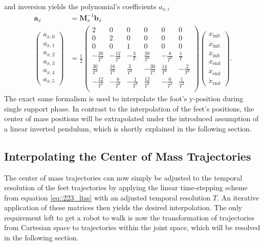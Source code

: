 and inversion yields the polynomial's coefficients $a_{x,i}$
\begin{align}
	\bm{a}_x &= \bm{M}_x^{-1}\bm{b}_x \\
	\begin{pmatrix}
		a_{x,0} \\
		a_{x,1} \\
		a_{x,2} \\
		a_{x,3} \\
		a_{x,4} \\
		a_{x,5}
	\end{pmatrix} &= 
	\frac{1}{2}
	\begin{pmatrix}
		2 & 0 & 0 & 0 & 0 & 0 \\
		0 & 2 & 0 & 0 & 0 & 0 \\
		0 & 0 & 1 & 0 & 0 & 0 \\
		-\frac{20}{T^3} & -\frac{12}{T^2} & -\frac{3}{T} & \frac{20}{T^3} & -\frac{8}{T^2} & \frac{1}{T} \\
		\frac{30}{T^4} & \frac{16}{T^3} & \frac{3}{T^2} & -\frac{30}{T^4} & \frac{14}{T^3} & -\frac{2}{T^2} \\
		-\frac{12}{T^5} & -\frac{6}{T^4} & -\frac{1}{T^3} & \frac{12}{T^5} & -\frac{6}{T^4} & \frac{1}{T^3} \\
	\end{pmatrix}
	\begin{pmatrix}
		x_\text{init} \\
		\dot{x}_\text{init} \\
		\ddot{x}_\text{init} \\
		x_\text{end} \\
		\dot{x}_\text{end} \\
		\ddot{x}_\text{end} 
	\end{pmatrix}.
	\label{eq::231_ai_5th}
\end{align}
The exact same formalism is used to interpolate the foot's y-position during single support phase. In contrast to the interpolation of the feet's positions, the center of mass positions will be extrapolated under the introduced assumption of a linear inverted pendulum, which is shortly explained in the following section.
\FloatBarrier
\subsection{Interpolating the Center of Mass Trajectories}
The center of mass trajectories can now simply be adjusted to the temporal resolution of the feet trajectories by applying the linear time-stepping scheme from equation \ref{eq::223_ltss} with an adjusted temporal resolution $T$. An iterative application of these matrices then yields the desired interpolation. The only requirement left to get a robot to walk is now the transformation of trajectories from Cartesian space to trajectories within the joint space, which will be resolved in the following section.